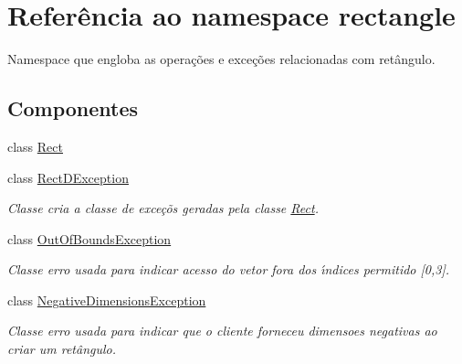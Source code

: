\hypertarget{namespacerectangle}{\section{Referência ao namespace rectangle}
\label{namespacerectangle}
}


Namespace que engloba as opera\c{c}\~{o}es e exce\c{c}\~{o}es relacionadas com ret\^{a}ngulo.  


\subsection*{Componentes}
\begin{DoxyCompactItemize}
\item 
class \hyperlink{classrectangle_1_1Rect}{Rect}
\item 
class \hyperlink{classrectangle_1_1RectDException}{Rect\-D\-Exception}
\begin{DoxyCompactList}\small\item\em Classe cria a classe de exce\c{c}\~{o}s geradas pela classe \hyperlink{classrectangle_1_1Rect}{Rect}. \end{DoxyCompactList}\item 
class \hyperlink{classrectangle_1_1OutOfBoundsException}{Out\-Of\-Bounds\-Exception}
\begin{DoxyCompactList}\small\item\em Classe erro usada para indicar acesso do vetor fora dos \'{\i}ndices permitido \mbox{[}0,3\mbox{]}. \end{DoxyCompactList}\item 
class \hyperlink{classrectangle_1_1NegativeDimensionsException}{Negative\-Dimensions\-Exception}
\begin{DoxyCompactList}\small\item\em Classe erro usada para indicar que o cliente forneceu dimensoes negativas ao criar um ret\^{a}ngulo. \end{DoxyCompactList}\end{DoxyCompactItemize}
